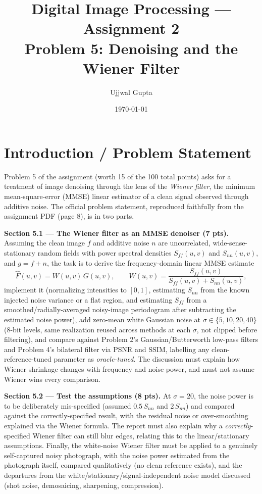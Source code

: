 \documentclass[11pt]{article}
\title{\textbf{Digital Image Processing --- Assignment 2}\\[0.3em]\large Problem 5: Denoising and the Wiener Filter}
\author{Ujjwal Gupta}
\date{\today}
\begin{document}
\maketitle
\tableofcontents
\vspace{1em}

\section{Introduction / Problem Statement}

Problem 5 of the assignment (worth 15 of the 100 total points) asks for a treatment of
image denoising through the lens of the \emph{Wiener filter}, the minimum mean-square-error
(MMSE) linear estimator of a clean signal observed through additive noise. The official
problem statement, reproduced faithfully from the assignment PDF (page 8), is in two parts.

\textbf{Section 5.1 --- The Wiener filter as an MMSE denoiser (7 pts).} Assuming the clean
image $f$ and additive noise $n$ are uncorrelated, wide-sense-stationary random fields with
power spectral densities $S_{ff}(u,v)$ and $S_{nn}(u,v)$, and $g=f+n$, the task is to derive
the frequency-domain linear MMSE estimate
\[
\hat F(u,v) = W(u,v)\,G(u,v), \qquad W(u,v) = \frac{S_{ff}(u,v)}{S_{ff}(u,v)+S_{nn}(u,v)},
\]
implement it (normalizing intensities to $[0,1]$, estimating $S_{nn}$ from the known injected
noise variance or a flat region, and estimating $S_{ff}$ from a smoothed/radially-averaged
noisy-image periodogram after subtracting the estimated noise power), add zero-mean white
Gaussian noise at $\sigma \in \{5,10,20,40\}$ (8-bit levels, same realization reused across
methods at each $\sigma$, not clipped before filtering), and compare against Problem 2's
Gaussian/Butterworth low-pass filters and Problem 4's bilateral filter via PSNR and SSIM,
labelling any clean-reference-tuned parameter as \emph{oracle-tuned}. The discussion must
explain how Wiener shrinkage changes with frequency and noise power, and must not assume
Wiener wins every comparison.

\textbf{Section 5.2 --- Test the assumptions (8 pts).} At $\sigma=20$, the noise power is to be
deliberately mis-specified (assumed $0.5\,S_{nn}$ and $2\,S_{nn}$) and compared against the
correctly-specified result, with the residual noise or over-smoothing explained via the Wiener
formula. The report must also explain why a \emph{correctly}-specified Wiener filter can still
blur edges, relating this to the linear/stationary assumptions. Finally, the white-noise Wiener
filter must be applied to a genuinely self-captured noisy photograph, with the noise power
estimated from the photograph itself, compared qualitatively (no clean reference exists), and
the departures from the white/stationary/signal-independent noise model discussed (shot noise,
demosaicing, sharpening, compression).
\end{document}
